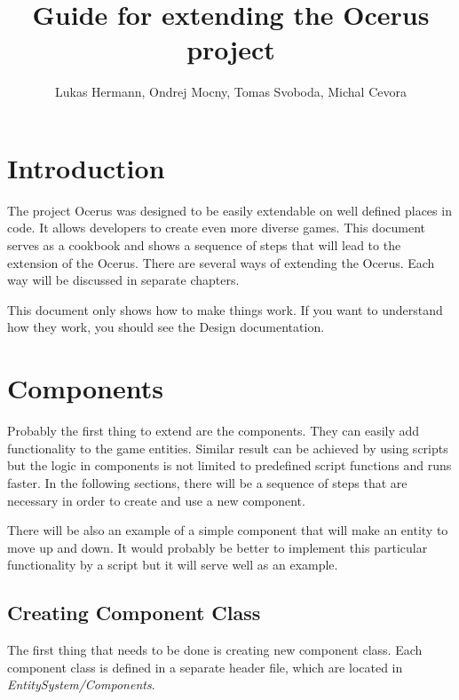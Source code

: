 \documentclass[a4paper, 12pt]{report}
\begin{document}
\pagestyle{empty} %

\title{Guide for extending the Ocerus project}
\author{Lukas Hermann, Ondrej Mocny, Tomas Svoboda, Michal Cevora}

\pagestyle{plain} %

\tableofcontents %
\cleardoublepage %

\chapter{Introduction}

The project Ocerus was designed to be easily extendable on well defined places in code. It allows developers to create even more diverse games. This document serves as a cookbook and shows a sequence of steps that will lead to the extension of the Ocerus. There are several ways of extending the Ocerus. Each way will be discussed in separate chapters.

This document only shows how to make things work. If you want to understand how they work, you should see the Design documentation.

\chapter{Components}

Probably the first thing to extend are the components. They can easily add functionality to the game entities. Similar result can be achieved by using scripts but the logic in components is not limited to predefined script functions and runs faster. In the following sections, there will be a sequence of steps that are necessary in order to create and use a new component. 

There will be also an example of a simple component that will make an entity to move up and down. It would probably be better to implement this particular functionality by a script but it will serve well as an example.

\section{Creating Component Class}
The first thing that needs to be done is creating new component class. Each component class is defined in a separate header file, which are located in \emph{EntitySystem/Components}.
\end{document}
